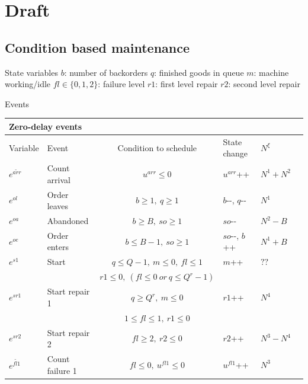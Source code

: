 \documentclass[]{interact}
\theoremstyle{plain}%
\theoremstyle{definition}
\theoremstyle{remark}
\begin{document}
\newpage
\newpage



\section{Draft}

\subsection{Condition based maintenance}

State variables
$b$: number of backorders
$q$: finished goods in queue
$m$: machine working/idle
$fl\in\{0,1,2\}$: failure level 
$r1$: first level repair
$r2$: second level repair

Events


\begin{table}[h]
	\begin{tabular}{lllllllll} 
		\multicolumn{9}{l}{\textbf{Zero-delay events}}\\ \hline
		Variable&Event &  \multicolumn{4}{c}{Condition to schedule} & State change&$N^{\xi}$&\\\hline
		$e^{\tilde{arr}}$ & Count arrival &  \multicolumn{4}{c}{$u^{arr}\le 0$} & $u^{arr}${\footnotesize++}&$N^1+N^2$& \\
		$e^{ol}$ & Order leaves&  \multicolumn{4}{c}{$b\ge 1,\ q\ge 1$} & $b${\small-}{\small-}, $q${\small-}{\small-}&$N^1$& \\
		$e^{oa}$ & Abandoned & \multicolumn{4}{c}{$b\ge B,\ so\ge 1$} &  $so${\small-}{\small-}&$N^2-B$&\\
		$e^{oe}$ & Order enters & \multicolumn{4}{c}{$b\le B-1,\ so\ge 1$} &  $so${\small-}{\small-}, $b${\footnotesize++}&$N^1+B$&\\
		$e^{s1}$ & Start & \multicolumn{4}{c}{$q\le Q-1,\ m\le 0,\  fl\le 1$} &  $m${\footnotesize++}&$??$&\\
		&& \multicolumn{4}{c}{$r1\le 0,\ (fl\le 0\ or\ q\le Q^r-1)$} &  &&\\
		$e^{sr1}$ & Start repair 1 & \multicolumn{4}{c}{$q\ge Q^r,\ m\le 0$} &  $r1${\footnotesize++}&$N^4$&\\	
		&& \multicolumn{4}{c}{$1\le fl\le 1,\ r1\le 0$} &  &&\\	
		$e^{sr2}$ & Start repair 2 & \multicolumn{4}{c}{$fl\ge 2,\ r2\le 0$} &  $r2${\footnotesize++}&$N^3-N^4$&\\	
		$e^{\tilde{fl1}}$ & Count failure 1 & \multicolumn{4}{c}{$fl\le 0,\ u^{fl1}\le 0$} & $u^{fl1}${\footnotesize++} &$N^3$&\\	

\end{tabular}
\end{table}
\end{document}
